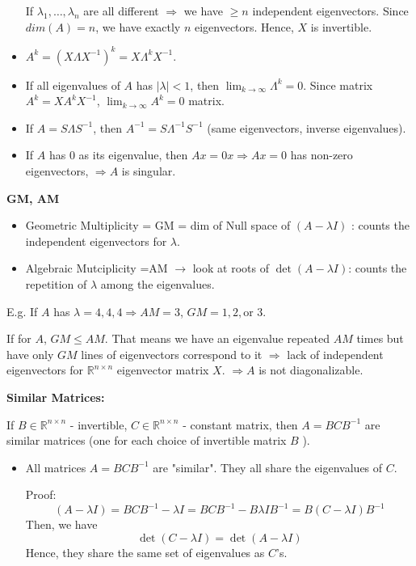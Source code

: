 \documentclass[13pt]{article}
\theoremstyle{definition}
\theoremstyle{remark}
\begin{document}
\begin{multicols}{2}
\begin{itemize}
    If $\lambda_1, \ldots, \lambda_n$ are all different $\Longrightarrow$ we have $\ge n$ independent eigenvectors. Since $dim(A)=n$, we have exactly $n$ eigenvectors. Hence, $X$ is invertible.
    \item $A^k =  (X\Lambda X^{-1})^k = X\Lambda^k X^{-1}$.
    \item If all eigenvalues of $A$ has $|\lambda|<1$, then $\lim _{k \rightarrow \infty} \Lambda^k=0$. Since matrix $A^k=X A^k X^{-1}$, $\lim_{k \rightarrow \infty} A^k = 0$ matrix.
    \item If $A=S \Lambda S^{-1}$, then $A^{-1}=S \Lambda^{-1} S^{-1}$ (same eigenvectors, inverse eigenvalues).
    \item If $A$ has $0$ as its eigenvalue, then $Ax = 0x \Longrightarrow  Ax = 0$ has non-zero eigenvectors, $\Longrightarrow A$ is singular.
\end{itemize}
\textbf{GM, AM} 
\begin{itemize}
    \item Geometric Multiplicity = GM = dim of Null space of $(A-\lambda I)$ : counts the independent eigenvectors for $\lambda$.
    \item Algebraic Mutciplicity =AM $\rightarrow$ look at roots of $\operatorname{det}(A-\lambda I)$: counts the repetition of $\lambda$ among the eigenvalues.
\end{itemize}
E.g. If $A$ has $\lambda=4,4,4 \Rightarrow AM=3$, $GM=1,2, \text {or } 3$.

If for $A$, $GM \le AM$. That means we have an eigenvalue repeated $AM$ times but have only $GM$ lines of eigenvectors correspond to it $\Rightarrow$ lack of independent eigenvectors for $\mathbb{R}^{n\times n}$ eigenvector matrix $X$. $\Rightarrow A$ is not diagonalizable.


\textbf{Similar Matrices:}

If $B \in \mathbb{R}^{n \times n}$ - invertible, $C \in \mathbb{R}^{n \times n}$ - constant matrix, then $A=B C B^{-1}$ are similar matrices (one for each choice of invertible matrix $B$ ).
\begin{itemize}
    \item All matrices $A=B C B^{-1}$ are "similar". They all share the eigenvalues of $C$.
    
    Proof: \[
    (A-\lambda I)=B C B^{-1}-\lambda I=BCB^{-1}-B \lambda I B^{-1}=B(C-\lambda I) B^{-1} 
    \]
    Then, we have
    \[\operatorname{det}(C-\lambda I) = \operatorname{det}(A-\lambda I)
    \]
    Hence, they share the same set of eigenvalues as $C$'s.
\end{itemize}

\end{multicols}
\end{document}
